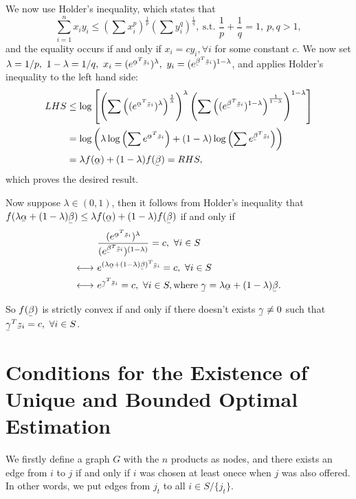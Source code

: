 \documentclass[11pt]{article}
\newcommand{\ubar}[1]{\underaccent{\bar}{#1}}
\begin{document}
We now use Holder's inequality, which states that
$$\sum_{i=1}^nx_iy_i\leq(\sum x_i^p)^{\frac{1}{p}}(\sum y_i^q)^{\frac{1}{q}}, \ \text{s.t. } \frac{1}{p}+\frac{1}{q}=1, \ p,q>1,$$
and the equality occurs if and only if $x_i=cy_i, \forall i$ for some constant $c$. We now set $\lambda=1/p,\ 1-\lambda=1/q, \ x_i=(e^{\ubar \alpha^T \ubar z_i})^\lambda, \ y_i=(e^{\ubar \beta^T \ubar z_i})^{1-\lambda}$, and applies Holder's inequality to the left hand side:
\begin{align*}
LHS&\leq \log \left[ \left(  \sum\left( (e^{\ubar \alpha^T \ubar z_i})^{\lambda} \right)^{\frac{1}{\lambda}}  \right)^{\lambda}  \left(  \sum\left( (e^{\ubar \beta^T \ubar z_i})^{1-\lambda} \right)^{\frac{1}{1-\lambda}}  \right)^{1-\lambda}   \right]\\
&=\log \left( \lambda \log \left( \sum e^{\ubar \alpha^T \ubar z_i} \right)  +(1- \lambda) \log \left( \sum e^{\ubar \beta^T \ubar z_i} \right)\right)\\
&=\lambda f(\ubar \alpha)+(1-\lambda)f(\ubar \beta)=RHS,
\end{align*} 
which proves the desired result.

Now suppose $\lambda\in(0,1)$, then it follows from Holder's inequality that $f(\lambda \ubar \alpha+(1-\lambda)\ubar \beta)\leq \lambda f(\ubar \alpha)+(1-\lambda)f(\ubar \beta)$ if and only if
\begin{align*}
&\frac{(e^{\ubar \alpha^T \ubar z_i})^\lambda}{(e^{\ubar \beta^T \ubar z_i})^{(1-\lambda)}}=c, \ \forall i\in S\\
\longleftrightarrow \ & e^{(\lambda \ubar \alpha +(1-\lambda)\ubar \beta)^T \ubar z_i}=c, \ \forall i \in S\\
\longleftrightarrow \ & e^{\ubar \gamma^T \ubar z_i}=c, \ \forall i \in S, \text{where }\ubar \gamma =\lambda \ubar \alpha +(1-\lambda) \ubar \beta.
\end{align*}

So $f(\ubar \beta)$ is strictly convex if and only if there doesn't exists $\ubar \gamma\neq 0$ such that $\ubar \gamma^T \ubar z_i=c, \ \forall i \in S$.

\section{Conditions for the Existence of Unique and Bounded Optimal Estimation}
We firstly define a graph $G$ with the $n$ products as nodes, and there exists an edge from $i$ to $j$ if and only if $i$ was chosen at least onece when $j$ was also offered. In other words, we put edges from $j_t$ to all $i \in S/\{j_t\}$.
\end{document}
